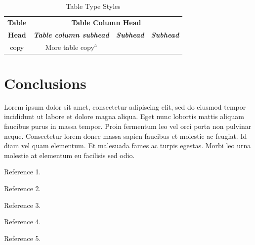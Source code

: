 \documentclass[conference]{IEEEtran}
\begin{document}
\begin{table}[htbp]
\caption{Table Type Styles}
\begin{center}
\begin{tabular}{|c|c|c|c|}
\hline
\textbf{Table}&\multicolumn{3}{|c|}{\textbf{Table Column Head}} \\
\cline{2-4} 
\textbf{Head} & \textbf{\textit{Table column subhead}}& \textbf{\textit{Subhead}}& \textbf{\textit{Subhead}} \\
\hline
copy& More table copy$^{\mathrm{a}}$& &  \\
\hline
\end{tabular}
\label{tab1}
\end{center}
\end{table}





\section{Conclusions}

Lorem ipsum dolor sit amet, consectetur adipiscing elit, sed do eiusmod tempor incididunt ut labore et dolore magna aliqua. Eget nunc lobortis mattis aliquam faucibus purus in massa tempor. Proin fermentum leo vel orci porta non pulvinar neque. Consectetur lorem donec massa sapien faucibus et molestie ac feugiat. Id diam vel quam elementum. Et malesuada fames ac turpis egestas. Morbi leo urna molestie at elementum eu facilisis sed odio.





\begin{thebibliography}{00}

 Reference 1.

 Reference 2.

 Reference 3.

 Reference 4.

 Reference 5.

\end{thebibliography}
\end{document}
